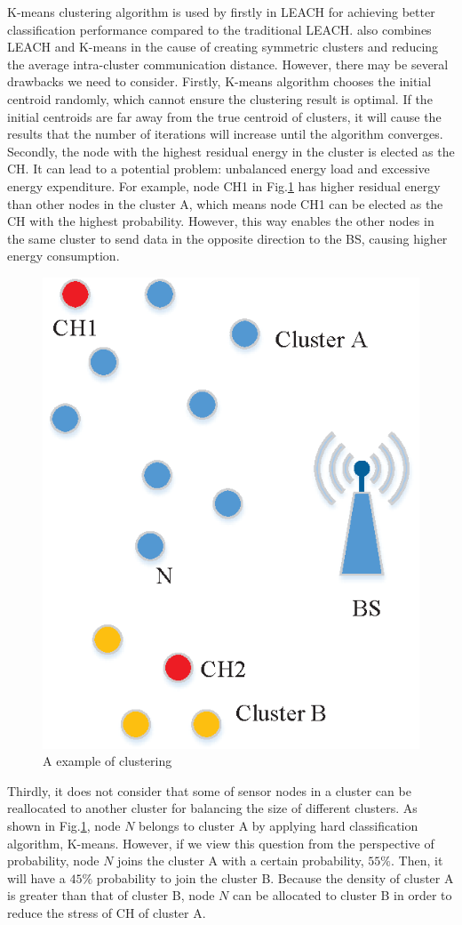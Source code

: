 \documentclass[11pt]{report}
\begin{document}
	\noindent K-means clustering algorithm is used by \cite{6375088} firstly in LEACH for achieving better classification performance compared to the traditional LEACH. \cite{Bidaki2016TowardsEE} also combines LEACH and K-means in the cause of creating symmetric clusters and reducing the average intra-cluster communication distance. However, there may be several drawbacks we need to consider. Firstly, K-means algorithm chooses the initial centroid randomly, which cannot ensure the clustering result is optimal. If the initial centroids are far away from the true centroid of clusters, it will cause the results that the number of iterations will increase until the algorithm converges. Secondly, the node with the highest residual energy in the cluster is elected as the CH. It can lead to a potential problem: unbalanced energy load and excessive energy expenditure. For example, node CH1 in Fig.\ref {cha} has higher residual energy than other nodes in the cluster A, which means node CH1 can be elected as the CH with the highest probability. However, this way enables the other nodes in the same cluster to send data in the opposite direction to the BS, causing higher energy consumption. 
	\begin{figure}[!h]
		\centering
		\includegraphics[width=0.3\linewidth]{cha.eps}
		\caption{A example of clustering}
		\label{cha}
	\end{figure}
	 Thirdly, it does not consider that some of sensor nodes in a cluster can be reallocated to another cluster for balancing the size of different clusters. As shown in Fig.\ref{cha}, node $N$ belongs to cluster A by applying hard classification algorithm, K-means. However, if we view this question from the perspective of probability, node $N$ joins the cluster A with a certain probability, $55\%$. Then, it will have a $45\%$ probability to join the cluster B. Because the density of cluster A is greater than that of cluster B, node $N$ can be allocated to cluster B in order to reduce the stress of CH of cluster A. 
\end{document}
